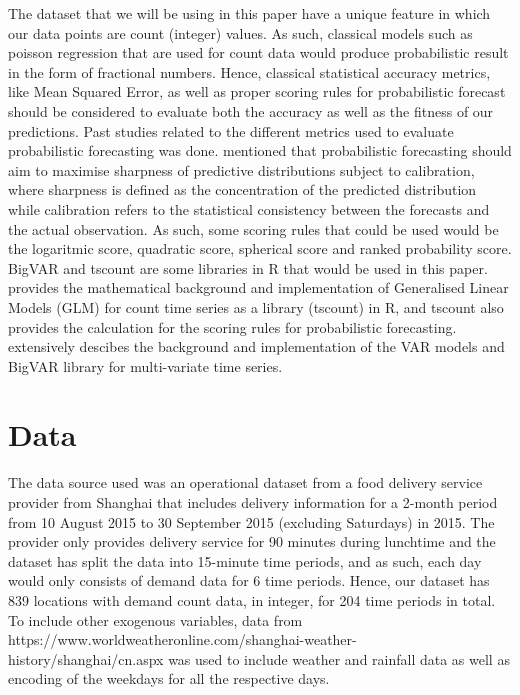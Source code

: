 \documentclass[nonblindrev,msom]{informs3} %
\begin{document}
\noindent The dataset that we will be using in this paper have a unique feature in which our data points are count (integer) values. As such, classical models such as poisson regression that are used for count data would produce probabilistic result in the form of fractional numbers. Hence, classical statistical accuracy metrics, like Mean Squared Error, as well as proper scoring rules for probabilistic forecast should be considered to evaluate both the accuracy as well as the fitness of our predictions. Past studies related to the different metrics used to evaluate probabilistic forecasting was done. \cite{Czado2009PredictiveMA} mentioned that probabilistic forecasting should aim to maximise sharpness of predictive distributions subject to calibration, where sharpness is defined as the concentration of the predicted distribution while calibration refers to the statistical consistency between the forecasts and the actual observation. As such, some scoring rules that could be used would be the logaritmic score, quadratic score, spherical score and ranked probability score. \\

\noindent BigVAR and tscount are some libraries in R that would be used in this paper. \cite{Tobias2017} provides the mathematical background and implementation of Generalised Linear Models (GLM) for count time series as a library (tscount) in R, and tscount also provides the calculation for the scoring rules for probabilistic forecasting. \cite{William2017} extensively descibes the background and implementation of the VAR models and BigVAR library for multi-variate time series. 


\section{Data}
The data source used was an operational dataset from a food delivery service provider from Shanghai that includes delivery information for a 2-month period from 10 August 2015 to 30 September 2015 (excluding Saturdays) in 2015. The provider only provides delivery service for 90 minutes during lunchtime and the dataset has split the data into 15-minute time periods, and as such, each day would only consists of demand data for 6 time periods. Hence, our dataset has 839 locations with demand count data, in integer, for 204 time periods in total. \\

\noindent To include other exogenous variables, data from https://www.worldweatheronline.com/shanghai-weather-history/shanghai/cn.aspx was used to include weather and rainfall data as well as encoding of the weekdays for all the respective days. 
\end{document}
